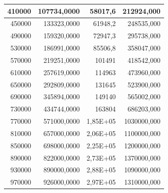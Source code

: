 \documentclass[a4paper, 12pt]{article}
\begin{document}
\begin{longtable}[c]{rrrr}
	\multicolumn{1}{|r|}{410000}                  & \multicolumn{1}{r|}{107734,0000}       & \multicolumn{1}{r|}{58017,6}           & \multicolumn{1}{r|}{212924,000}     \\ \hline
	\multicolumn{1}{|r|}{450000}                  & \multicolumn{1}{r|}{133323,0000}       & \multicolumn{1}{r|}{61948,2}           & \multicolumn{1}{r|}{248535,000}     \\ \hline
	\multicolumn{1}{|r|}{490000}                  & \multicolumn{1}{r|}{159320,0000}       & \multicolumn{1}{r|}{72947,3}           & \multicolumn{1}{r|}{295738,000}     \\ \hline
	\multicolumn{1}{|r|}{530000}                  & \multicolumn{1}{r|}{186991,0000}       & \multicolumn{1}{r|}{85506,8}           & \multicolumn{1}{r|}{358047,000}     \\ \hline
	\multicolumn{1}{|r|}{570000}                  & \multicolumn{1}{r|}{219251,0000}       & \multicolumn{1}{r|}{101491}            & \multicolumn{1}{r|}{418542,000}     \\ \hline
	\multicolumn{1}{|r|}{610000}                  & \multicolumn{1}{r|}{257619,0000}       & \multicolumn{1}{r|}{114963}            & \multicolumn{1}{r|}{473960,000}     \\ \hline
	\multicolumn{1}{|r|}{650000}                  & \multicolumn{1}{r|}{292809,0000}       & \multicolumn{1}{r|}{131645}            & \multicolumn{1}{r|}{523900,000}     \\ \hline
	\multicolumn{1}{|r|}{690000}                  & \multicolumn{1}{r|}{345894,0000}       & \multicolumn{1}{r|}{149140}            & \multicolumn{1}{r|}{565002,000}     \\ \hline
	\multicolumn{1}{|r|}{730000}                  & \multicolumn{1}{r|}{434744,0000}       & \multicolumn{1}{r|}{163804}            & \multicolumn{1}{r|}{686203,000}     \\ \hline
	\multicolumn{1}{|r|}{770000}                  & \multicolumn{1}{r|}{571000,0000}       & \multicolumn{1}{r|}{1,85E+05}          & \multicolumn{1}{r|}{1030000,000}    \\ \hline
	\multicolumn{1}{|r|}{810000}                  & \multicolumn{1}{r|}{657000,0000}       & \multicolumn{1}{r|}{2,06E+05}          & \multicolumn{1}{r|}{1100000,000}    \\ \hline
	\multicolumn{1}{|r|}{850000}                  & \multicolumn{1}{r|}{698000,0000}       & \multicolumn{1}{r|}{2,25E+05}          & \multicolumn{1}{r|}{1200000,000}    \\ \hline
	\multicolumn{1}{|r|}{890000}                  & \multicolumn{1}{r|}{822000,0000}       & \multicolumn{1}{r|}{2,73E+05}          & \multicolumn{1}{r|}{1370000,000}    \\ \hline
	\multicolumn{1}{|r|}{930000}                  & \multicolumn{1}{r|}{890000,0000}       & \multicolumn{1}{r|}{2,88E+05}          & \multicolumn{1}{r|}{1090000,000}    \\ \hline
	\multicolumn{1}{|r|}{970000}                  & \multicolumn{1}{r|}{926000,0000}       & \multicolumn{1}{r|}{2,97E+05}          & \multicolumn{1}{r|}{1310000,000}    \\ \hline
\end{longtable}
\end{document}
